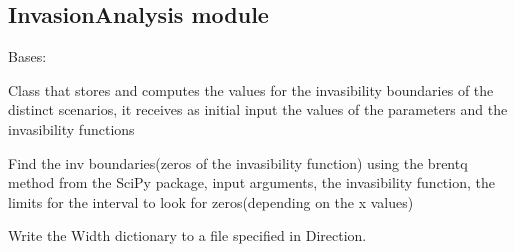 \documentclass[letterpaper,10pt,english]{sphinxmanual}
\begin{document}
\subsection{InvasionAnalysis module}
\label{Analisis/InvasionAnalysis::doc}\label{Analisis/InvasionAnalysis:module-InvasionAnalysis}\label{Analisis/InvasionAnalysis:invasionanalysis-module}

\begin{fulllineitems}
\label{Analisis/InvasionAnalysis:InvasionAnalysis.InvBoundaries}
Bases: {\hyperref[Analisis/Baseclass:Baseclass.BSR]{}}

Class that stores and computes the values for the invasibility boundaries of the distinct scenarios, it receives as initial
input the values of the parameters and the invasibility functions

\begin{fulllineitems}
\label{Analisis/InvasionAnalysis:InvasionAnalysis.InvBoundaries.InvBoundary}
Find the inv boundaries(zeros of the invasibility function) using the brentq method from the SciPy package,
input arguments, the invasibility function, the limits for the interval to look for zeros(depending on the x values)

\end{fulllineitems}


\begin{fulllineitems}
\label{Analisis/InvasionAnalysis:InvasionAnalysis.InvBoundaries.UpdateMass}
\end{fulllineitems}


\begin{fulllineitems}
\label{Analisis/InvasionAnalysis:InvasionAnalysis.InvBoundaries.WriteWidths}
Write the Width dictionary to a file specified in Direction.


\end{fulllineitems}
\end{fulllineitems}
\end{document}
